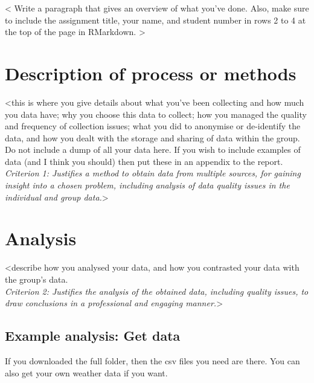 \documentclass[
]{article}
\begin{document}
\textless{} Write a paragraph that gives an overview of what you've
done. Also, make sure to include the assignment title, your name, and
student number in rows 2 to 4 at the top of the page in RMarkdown.
\textgreater{}

\hypertarget{description-of-process-or-methods}{%
\section{Description of process or
methods}\label{description-of-process-or-methods}}

\textless this is where you give details about what you've been
collecting and how much you data have; why you choose this data to
collect; how you managed the quality and frequency of collection issues;
what you did to anonymise or de-identify the data, and how you dealt
with the storage and sharing of data within the group. Do not include a
dump of all your data here. If you wish to include examples of data (and
I think you should) then put these in an appendix to the report.\\
\emph{Criterion 1: Justifies a method to obtain data from multiple
sources, for gaining insight into a chosen problem, including analysis
of data quality issues in the individual and group data.}\textgreater{}

\hypertarget{analysis}{%
\section{Analysis}\label{analysis}}

\textless describe how you analysed your data, and how you contrasted
your data with the group's data.\\
\emph{Criterion 2: Justifies the analysis of the obtained data,
including quality issues, to draw conclusions in a professional and
engaging manner.}\textgreater{}

\hypertarget{example-analysis-get-data}{%
\subsection{Example analysis: Get
data}\label{example-analysis-get-data}}

If you downloaded the full folder, then the csv files you need are
there. You can also get your own weather data if you want.
\end{document}
